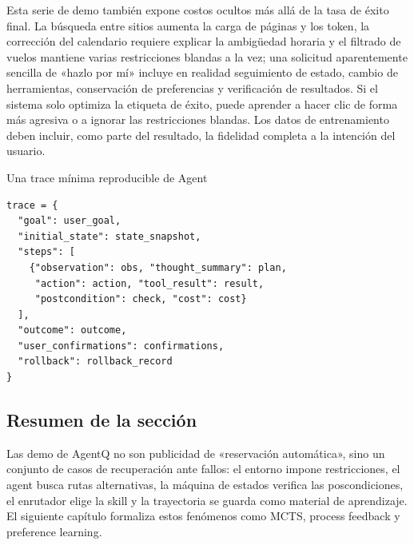 



Esta serie de demo también expone costos ocultos más allá de la tasa de éxito final. La búsqueda entre sitios aumenta la carga de páginas y los token, la corrección del calendario requiere explicar la ambigüedad horaria y el filtrado de vuelos mantiene varias restricciones blandas a la vez; una solicitud aparentemente sencilla de «hazlo por mí» incluye en realidad seguimiento de estado, cambio de herramientas, conservación de preferencias y verificación de resultados. Si el sistema solo optimiza la etiqueta de éxito, puede aprender a hacer clic de forma más agresiva o a ignorar las restricciones blandas. Los datos de entrenamiento deben incluir, como parte del resultado, la fidelidad completa a la intención del usuario.


\begin{importantbox}{Una trace mínima reproducible de Agent}
\begin{lstlisting}[caption={Campos mínimos que debe guardar una trayectoria de Agent}]
trace = {
  "goal": user_goal,
  "initial_state": state_snapshot,
  "steps": [
    {"observation": obs, "thought_summary": plan,
     "action": action, "tool_result": result,
     "postcondition": check, "cost": cost}
  ],
  "outcome": outcome,
  "user_confirmations": confirmations,
  "rollback": rollback_record
}
\end{lstlisting}
\end{importantbox}

\subsection{Resumen de la sección}

Las demo de AgentQ no son publicidad de «reservación automática», sino un conjunto de casos de recuperación ante fallos: el entorno impone restricciones, el agent busca rutas alternativas, la máquina de estados verifica las poscondiciones, el enrutador elige la skill y la trayectoria se guarda como material de aprendizaje. El siguiente capítulo formaliza estos fenómenos como MCTS, process feedback y preference learning.
